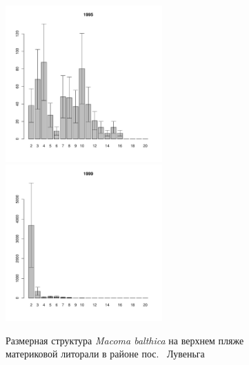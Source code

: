 \documentclass[12pt, a4paper]{article}
\begin{document}
\begin{figure}[h]
\begin{multicols}{3}
\hfill
\includegraphics[width=60mm]{../White_Sea/Luvenga_II_razrez/high_beatch2_1995_.pdf}
\hfill
\includegraphics[width=60mm]{../White_Sea/Luvenga_II_razrez/high_beatch2_1999_.pdf}

\end{multicols}


\caption{Размерная структура {\it Macoma balthica} на верхнем пляже материковой литорали в районе пос.~ Лувеньга}
\label{ris:size_str_2razrez_high}
\end{figure}
\end{document}
